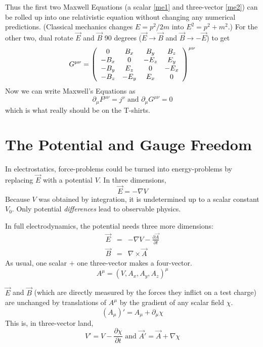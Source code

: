 \documentclass[12pt]{article}
\begin{document}
Thus the first two Maxwell Equations (a scalar \ref{me1} and
three-vector \ref{me2}) can be rolled up into one relativistic
equation without changing any numerical predictions.  (Classical
mechanics changes $E = p^2/2m$ into $E^2 = p^2 + m^2$.)  For the other
two, dual rotate $\vec{E}$ and $\vec{B}$ 90 degrees ($\vec{E} \to
\vec{B}$ and $\vec{B} \to -\vec{E}$) to get
\begin{equation}
  G^{\mu\nu} = \left(\begin{array}{c c c c}
0 & B_x & B_y & B_z \\
-B_x & 0 & -E_z & E_y \\
-B_y & E_z & 0 & -E_x \\
-B_z & -E_y & E_x & 0
\end{array}\right)^{\mu\nu}
\end{equation}
Now we can write Maxwell's Equations as
\begin{equation}
  \partial_\mu F^{\mu\nu} = j^\nu \mbox{ and } \partial_\mu G^{\mu\nu} = 0
\end{equation}
which is what really should be on the T-shirts.

\section{The Potential and Gauge Freedom}

In electrostatics, force-problems could be turned into energy-problems
by replacing $\vec{E}$ with a potential $V$.  In three dimensions,
\begin{equation}
  \vec{E} = -\nabla V
\end{equation}
Because $V$ was obtained by integration, it is undetermined up to a
scalar constant $V_0$.  Only potential {\it differences} lead to
observable physics.

In full electrodynamics, the potential needs three more dimensions:
\begin{eqnarray}
  \vec{E} &=& -\nabla V - \frac{\partial \vec{A}}{\partial t} \\
  \vec{B} &=& \nabla \times \vec{A}
\end{eqnarray}
As usual, one scalar $+$ one three-vector makes a four-vector.
\begin{equation}
  A^\mu = (V, A_x, A_y, A_z)^\mu
\end{equation}

$\vec{E}$ and $\vec{B}$ (which are directly measured by the forces
they inflict on a test charge) are unchanged by translations of
$A^\mu$ by the gradient of any scalar field $\chi$.
\begin{equation}
  (A_\mu)' = A_\mu + \partial_\mu \chi
\end{equation}
This is, in three-vector land,
\begin{equation}
  V' = V - \frac{\partial \chi}{\partial t} \mbox{ and }
  \vec{A}' = \vec{A} + \nabla \chi
\end{equation}
\end{document}
